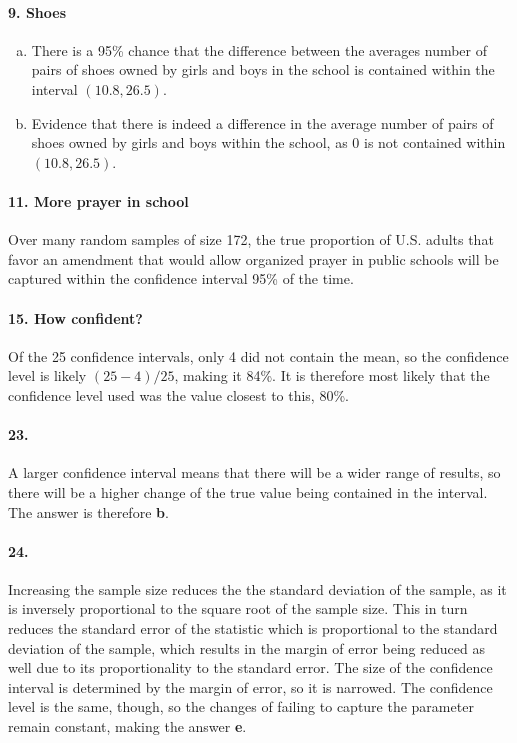 		\paragraph{9. Shoes}
			\begin{enumerate}[a.]
				\item
					There is a 95\% chance that the difference between the averages number of pairs of shoes owned by girls and boys in the school is contained within the interval $(10.8, 26.5)$.
				\item
					Evidence that there is indeed a difference in the average number of pairs of shoes owned by girls and boys within the school, as 0 is not contained within $(10.8, 26.5)$.
			\end{enumerate}
		\paragraph{11. More prayer in school}
			Over many random samples of size 172, the true proportion of U.S. adults that favor an amendment that would allow organized prayer in public schools will be captured within the confidence interval 95\% of the time.
		\paragraph{15. How confident?}
			Of the 25 confidence intervals, only 4 did not contain the mean, so the confidence level is likely $(25 - 4)/25$, making it 84\%. It is therefore most likely that the confidence level used was the value closest to this, 80\%.
		\paragraph{23.} 
			A larger confidence interval means that there will be a wider range of results, so there will be a higher change of the true value being contained in the interval. The answer is therefore \textbf{b}.
		\paragraph{24.} 
			Increasing the sample size reduces the the standard deviation of the sample, as it is inversely proportional to the square root of the sample size. This in turn reduces the standard error of the statistic which is proportional to the standard deviation of the sample, which results in the margin of error being reduced as well due to its proportionality to the standard error. The size of the confidence interval is determined by the margin of error, so it is narrowed. The confidence level is the same, though, so the changes of failing to capture the parameter remain constant, making the answer \textbf{e}.		
